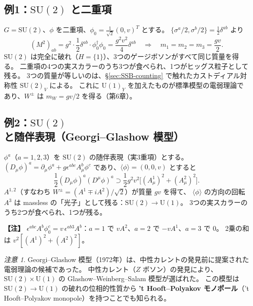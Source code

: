 \documentclass[uplatex,dvipdfmx,a4paper,11pt,openany]{jsbook}
\newcommand{\term}[2]{\textbf{#1}（#2）}
\newenvironment{note}{\vspace{1ex}\par\footnotesize\noindent\textbf{【注】}}{\par\vspace{1ex}}
\numberwithin{equation}{chapter}
\theoremstyle{definition}
\theoremstyle{plain}
\theoremstyle{remark}
\newtheorem{remark}{注意}[chapter]
\newcommand{\SU}{\mathrm{SU}}
\newcommand{\U}{\mathrm{U}}
\begin{document}
\subsection{例1：$\SU(2)$ と二重項}
$G=\SU(2)$、$\phi$ を二重項、$\phi_0=\frac{1}{\sqrt2}(0,v)^T$ とする。
$\{\sigma^a/2,\sigma^b/2\}=\frac12\delta^{ab}$ より
\begin{equation}
(M^2)_{ab}=g^2\cdot\frac12\delta^{ab}\cdot\phi_0^\dagger\phi_0=\frac{g^2v^2}{4}\delta^{ab}
\quad\Longrightarrow\quad
m_1=m_2=m_3=\frac{gv}{2}.
\end{equation}
$\SU(2)$ は完全に破れ（$H=\{1\}$）、3つのゲージボソンがすべて同じ質量を得る。
二重項の4つの実スカラーのうち3つが食べられ、1つがヒッグス粒子として残る。
3つの質量が等しいのは、\S\ref{sec:SSB-counting} で触れたカストディアル対称性 $\SU(2)_V$ による。
これに $\U(1)_Y$ を加えたものが標準模型の電弱理論であり、$W^\pm$ は $m_W=gv/2$ を得る（第6章）。
\subsection{例2：$\SU(2)$ と随伴表現（Georgi--Glashow 模型）}
$\phi^a$（$a=1,2,3$）を $\SU(2)$ の随伴表現（実3重項）とする。
$(D_\mu\phi)^a=\partial_\mu\phi^a+g\epsilon^{abc}A^b_\mu\phi^c$ であり、$\langle\phi\rangle=(0,0,v)$ とすると
\begin{equation}
\frac12(D_\mu\phi)^a(D^\mu\phi)^a\supset\frac12g^2v^2\bigl[(A^1_\mu)^2+(A^2_\mu)^2\bigr].
\end{equation}
$A^{1,2}$（すなわち $W^\pm=(A^1\mp iA^2)/\sqrt2$）が質量 $gv$ を得て、
$\langle\phi\rangle$ の方向の回転 $A^3$ は massless の「光子」として残る：$\SU(2)\to\U(1)$。
3つの実スカラーのうち2つが食べられ、1つが残る。
\begin{note}
$\epsilon^{abc}A^b\phi_0^c=v\,\epsilon^{ab3}A^b$：$a=1$ で $vA^2$、$a=2$ で $-vA^1$、$a=3$ で $0$。
2乗の和は $v^2[(A^1)^2+(A^2)^2]$。
\end{note}
\begin{remark}
Georgi--Glashow 模型（1972年）は、中性カレントの発見前に提案された電弱理論の候補であった。
中性カレント（$Z$ ボソン）の発見により、$\SU(2)\times\U(1)$ の Glashow--Weinberg--Salam 模型が選ばれた。
この模型は $\SU(2)\to\U(1)$ の破れの位相的性質から \term{'t Hooft--Polyakov モノポール}{'t Hooft--Polyakov monopole}を持つことでも知られる。
\end{remark}
\end{document}
